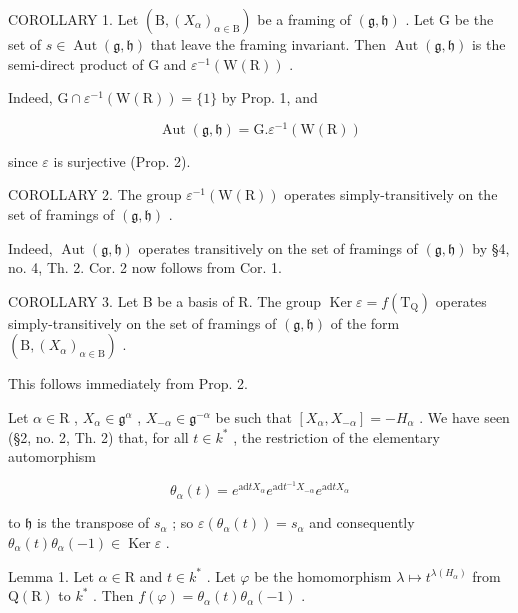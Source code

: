 COROLLARY 1. Let \((\mathrm{B}, (X_{\alpha})_{\alpha \in \mathrm{B}})\) be a framing of \((\mathfrak{g}, \mathfrak{h})\) . Let \(\mathrm{G}\) be the set of \(s \in \operatorname{Aut}(\mathfrak{g}, \mathfrak{h})\) that leave the framing invariant. Then \(\operatorname{Aut}(\mathfrak{g}, \mathfrak{h})\) is the semi-direct product of \(\mathrm{G}\) and \(\varepsilon^{-1}(\mathrm{W}(\mathrm{R}))\) .

Indeed, \(\mathrm{G} \cap \varepsilon^{-1}(\mathrm{W}(\mathrm{R})) = \{1\}\) by Prop. 1, and

\[
\operatorname{Aut} (\mathfrak {g}, \mathfrak {h}) = \mathrm{G}. \varepsilon^ {- 1} (\mathrm{W(R)})
\]

since \(\varepsilon\) is surjective (Prop. 2).

COROLLARY 2. The group \(\varepsilon^{-1}(\mathrm{W}(\mathrm{R}))\) operates simply-transitively on the set of framings of \((\mathfrak{g},\mathfrak{h})\) .

Indeed, \(\operatorname{Aut}(\mathfrak{g},\mathfrak{h})\) operates transitively on the set of framings of \((\mathfrak{g},\mathfrak{h})\) by §4, no. 4, Th. 2. Cor. 2 now follows from Cor. 1.

COROLLARY 3. Let B be a basis of R. The group \(\operatorname{Ker} \varepsilon = f(\mathrm{T}_{\mathrm{Q}})\) operates simply-transitively on the set of framings of \((\mathfrak{g}, \mathfrak{h})\) of the form \((\mathrm{B}, (X_{\alpha})_{\alpha \in \mathrm{B}})\) .

This follows immediately from Prop. 2.

Let \(\alpha \in \mathrm{R}\) , \(X_{\alpha} \in \mathfrak{g}^{\alpha}\) , \(X_{-\alpha} \in \mathfrak{g}^{-\alpha}\) be such that \([X_{\alpha}, X_{-\alpha}] = -H_{\alpha}\) . We have seen (§2, no. 2, Th. 2) that, for all \(t \in k^{*}\) , the restriction of the elementary automorphism

\[
\theta_ {\alpha} (t) = e ^ {\mathrm{ad} t X _ {\alpha}} e ^ {\mathrm{ad} t ^ {- 1} X _ {- \alpha}} e ^ {\mathrm{ad} t X _ {\alpha}}
\]

to \(\mathfrak{h}\) is the transpose of \(s_{\alpha}\) ; so \(\varepsilon(\theta_{\alpha}(t)) = s_{\alpha}\) and consequently \(\theta_{\alpha}(t)\theta_{\alpha}(-1) \in \operatorname{Ker} \varepsilon\) .

Lemma 1. Let \(\alpha \in \mathrm{R}\) and \(t\in k^{*}\) . Let \(\varphi\) be the homomorphism \(\lambda \mapsto t^{\lambda (H_{\alpha})}\) from \(\mathrm{Q(R)}\) to \(k^*\) . Then \(f(\varphi) = \theta_{\alpha}(t)\theta_{\alpha}(-1)\) .

